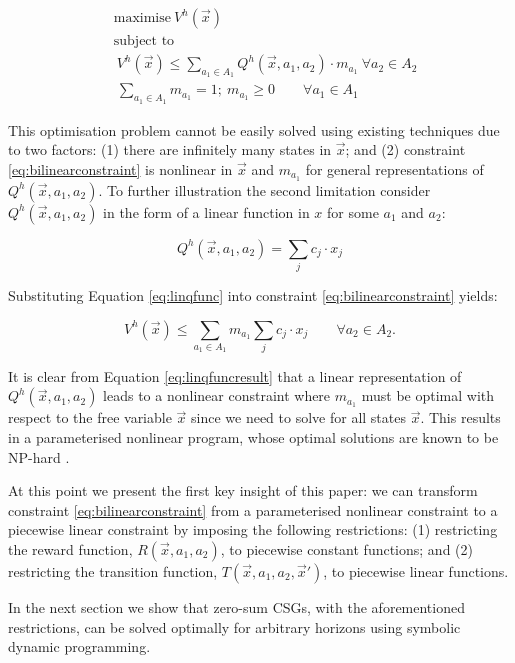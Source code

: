 {\small 
\abovedisplayskip=0pt
\belowdisplayskip=0pt
\begin{subequations}
\begin{align}
&\text{maximise}   \  V^{h}(\vec{x}) \nonumber \\
&\text{subject to}   \nonumber \\
&\   V^{h}(\vec{x}) \leq \sum_{a_1 \in A_1} Q^{h}(\vec{x}, a_1, a_2) \cdot m_{a_{1}} \   \forall a_2 \in A_2 \label{eq:bilinearconstraint} \\
                          &\  \sum_{a_{1} \in A_1} m_{a_{1}} = 1 ; \  m_{a_{1}} \geq 0 \qquad \forall a_{1} \in A_1 \nonumber
\end{align}
\end{subequations}
}%

This optimisation problem cannot be easily solved using existing techniques
due to two factors: (1) there are infinitely many states in $\vec{x}$; and
(2) constraint \eqref{eq:bilinearconstraint} is nonlinear in $\vec{x}$ and 
$m_{a_{1}}$ for general representations of {\small $Q^{h}(\vec{x}, a_1, a_2)$}. 
To further illustration the second limitation consider 
$Q^{h}(\vec{x}, a_1, a_2)$ in the form of a linear function in $x$ for some
$a_1$ and $a_2$:

{\small 
\abovedisplayskip=0pt
\belowdisplayshortskip=0pt
\begin{equation}
Q^{h}(\vec{x}, a_1, a_2) = \sum_{j} c_j \cdot x_j \label{eq:linqfunc}
\end{equation}
}%

Substituting Equation \eqref{eq:linqfunc} into constraint \eqref{eq:bilinearconstraint}
yields:

{\small 
\abovedisplayskip=0pt
\belowdisplayskip=0pt
\begin{equation}
V^{h}(\vec{x}) \leq \sum_{a_1 \in A_1} m_{a_{1}} \sum_{j} c_j \cdot x_j \qquad \forall a_2 \in A_2. \label{eq:linqfuncresult}
\end{equation}
}%

It is clear from Equation \eqref{eq:linqfuncresult} that a linear representation
of $Q^{h}(\vec{x}, a_1, a_2)$ leads to a nonlinear constraint
where $m_{a_{1}}$ must be optimal with respect to the free variable
$\vec{x}$ since we need to solve for all states $\vec{x}$. This results in 
a parameterised nonlinear program, whose optimal solutions are known to be
NP-hard \cite{Bennett_COA_1993,Petrik_JoMLR_2011}.

At this point we present the first key insight of this paper: we
can transform constraint \eqref{eq:bilinearconstraint} from a parameterised 
nonlinear constraint to a piecewise linear constraint by imposing the 
following restrictions: (1) restricting the reward function, {\small $R(\vec{x}, a_1, a_2)$}, 
to piecewise constant functions; and (2) restricting the transition function, 
{\small $T(\vec{x}, a_1, a_2, \vec{x}')$}, to piecewise linear functions.

In the next section we show that zero-sum CSGs, with the aforementioned
restrictions, can be solved optimally for arbitrary horizons using 
symbolic dynamic programming.